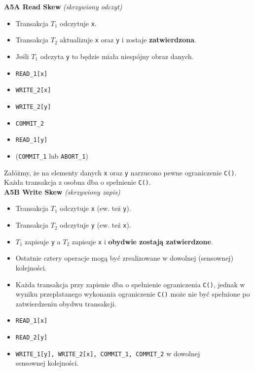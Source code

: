 \documentclass[a5paper,6pt]{article}
\begin{document}
    \textbf{A5A Read Skew} \textit{(skrzywiony odczyt)}
    \begin{itemize}
        \item Transakcja $T_1$ odczytuje \texttt{x}.
        \item Transakcja $T_2$ aktualizuje \texttt{x} oraz \texttt{y} i zostaje
              \textbf{zatwierdzona}.
        \item Jeśli $T_1$ odczyta \texttt{y} to będzie miała niespójny obraz
              danych.
        \item \texttt{READ\_1[x]}
        \item \texttt{WRITE\_2[x]}
        \item \texttt{WRITE\_2[y]}
        \item \texttt{COMMIT\_2}
        \item \texttt{READ\_1[y]}
        \item (\texttt{COMMIT\_1} lub \texttt{ABORT\_1})
    \end{itemize}

    Załóżmy, że na elementy danych \texttt{x} oraz \texttt{y} narzucono pewne
    ograniczenie \texttt{C()}. Każda transakcja z osobna dba o spełnienie
    \texttt{C()}.\\

    \textbf{A5B Write Skew} \textit{(skrzywiony zapis)}
    \begin{itemize}
        \item Transakcja $T_1$ odczytuje \texttt{x} (ew. też \texttt{y}).
        \item Transakcja $T_2$ odczytuje \texttt{y} (ew. też \texttt{x}).
        \item $T_1$ zapisuje \texttt{y} a $T_2$ zapisuje \texttt{x} i
              \textbf{obydwie zostają zatwierdzone}.
        \item Ostatnie cztery operacje mogą być zrealizowane w dowolnej
              (sensownej) kolejności.
        \item Każda transakcja przy zapisnie dba o spełnienie ograniczenia
              \texttt{C()}, jednak w wyniku przeplatanego wykonania ograniczenie
              \texttt{C()} może nie być spełnione po zatwierdzeniu obydwu
              transakcji.
        \item \texttt{READ\_1[x]}
        \item \texttt{READ\_2[y]}
        \item \texttt{WRITE\_1[y], WRITE\_2[x], COMMIT\_1, COMMIT\_2}
              w dowolnej\\ sensownej kolejności.
    \end{itemize}
\end{document}
